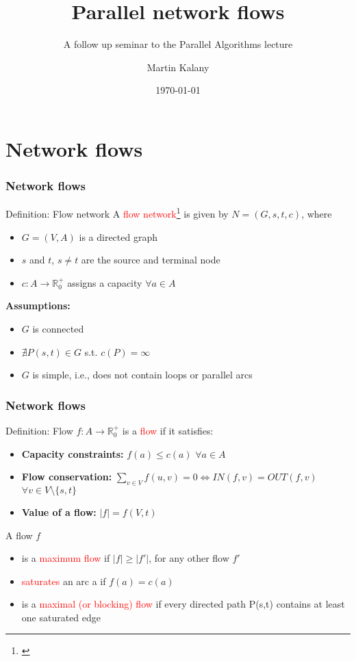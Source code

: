 \documentclass{beamer}
\title{Parallel network flows}
\subtitle{A follow up seminar to the Parallel Algorithms lecture}
\author{Martin Kalany\inst{1} }
\institute
{
  \inst{1}
  Graduate student in Computer Science\\
  Vienna University of Technology\\
}
\date{\today}
\begin{document}

\frame{\titlepage}
	
\section{Network flows}
\begin{frame}
	\frametitle{Network flows}
    \begin{block}{Definition: Flow network}
    A \textcolor{red}{flow network}\footnote{\cite{ahuja93}}  is given by $N = (G,s,t,c)$, where
    \begin{itemize}
    		\item $G =(V,A)$ is a directed graph
    		\item $s$ and $t$, $s \neq t$ are the source and terminal node
    		\item $c:A\rightarrow \mathbb{R}_0^{+}$ assigns a capacity $\forall a \in A$
    \end{itemize}
    \end{block}
    \textbf{Assumptions:}
	\begin{itemize}
		\item $G$ is connected
		\item $\nexists P(s,t) \in G$ s.t. $c(P) = \infty$
		\item $G$ is simple, i.e., does not contain loops or parallel arcs
	\end{itemize}
\end{frame}
  
\begin{frame}[shrink]
	\frametitle{Network flows}
	\begin{block}{Definition: Flow}
	$f:A \rightarrow \mathbb{R}_0^{+}$ is a \textcolor{red}{flow} if it satisfies:
	\begin{itemize}
		\item \textbf{Capacity constraints:} $f(a) \leq c(a)$ $\forall a \in A$
		\item \textbf{Flow conservation:} 
		$ \sum\limits_{v \in V} f(u,v) =  0 \Leftrightarrow IN(f,v) = OUT(f,v)$ $\forall v \in V \setminus \{s,t\}$
		\item \textbf{Value of a flow:} $\lvert f\rvert = f(V,t)$ 
	\end{itemize}
	\end{block}
	
	\begin{block}{A flow $f$}
	\begin{itemize}
		\item is a \textcolor{red}{maximum flow} if $\lvert f\rvert \geq \lvert f'\rvert$, for any other flow $f'$
		\item \textcolor{red}{saturates} an arc a if $f(a) = c(a)$
		\item is a \textcolor{red}{maximal (or blocking) flow} if every directed path P(s,t) contains at least one saturated edge
	\end{itemize}
	\end{block}
\end{frame}
\end{document}
